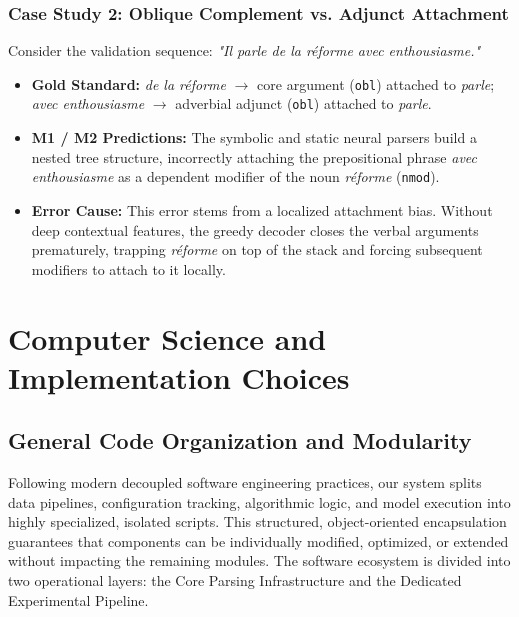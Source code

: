 \documentclass[12pt,a4paper]{article}
\begin{document}
\subsubsection{Case Study 2: Oblique Complement vs. Adjunct Attachment}
Consider the validation sequence: \textit{"Il parle de la réforme avec enthousiasme."}
\begin{itemize}
    \item \textbf{Gold Standard:} \textit{de la réforme} $\rightarrow$ core argument (\texttt{obl}) attached to \textit{parle}; \textit{avec enthousiasme} $\rightarrow$ adverbial adjunct (\texttt{obl}) attached to \textit{parle}.
    \item \textbf{M1 / M2 Predictions:} The symbolic and static neural parsers build a nested tree structure, incorrectly attaching the prepositional phrase \textit{avec enthousiasme} as a dependent modifier of the noun \textit{réforme} (\texttt{nmod}).
    \item \textbf{Error Cause:} This error stems from a localized attachment bias. Without deep contextual features, the greedy decoder closes the verbal arguments prematurely, trapping \textit{réforme} on top of the stack and forcing subsequent modifiers to attach to it locally.
\end{itemize}

\section{Computer Science and Implementation Choices}
\label{sec:computer_science_part}

\subsection{General Code Organization and Modularity}
\label{subsec:general_code_organization}

Following modern decoupled software engineering practices, our system splits data pipelines, configuration tracking, algorithmic logic, and model execution into highly specialized, isolated scripts. This structured, object-oriented encapsulation guarantees that components can be individually modified, optimized, or extended without impacting the remaining modules. The software ecosystem is divided into two operational layers: the Core Parsing Infrastructure and the Dedicated Experimental Pipeline.
\end{document}
